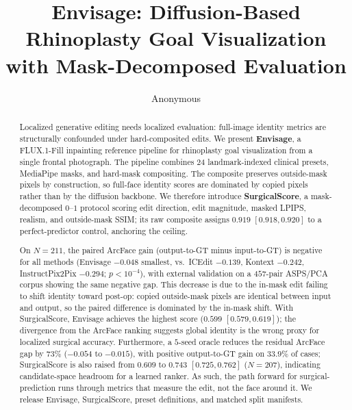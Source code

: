 \documentclass{article}
\title{Envisage: Diffusion-Based Rhinoplasty Goal Visualization with Mask-Decomposed Evaluation}
\author{Anonymous}
\newcommand{\method}{Envisage}
\begin{document}
\maketitle

\begin{abstract}
Localized generative editing needs localized evaluation: full-image identity
metrics are structurally confounded under hard-composited edits. We present
\textbf{\method{}}, a FLUX.1-Fill inpainting reference pipeline for
rhinoplasty goal visualization from a single frontal photograph. The
pipeline combines $24$ landmark-indexed clinical presets, MediaPipe masks,
and hard-mask compositing. The composite preserves outside-mask pixels by
construction, so full-face identity scores are dominated by copied pixels
rather than by the diffusion backbone. We therefore introduce
\textbf{SurgicalScore}, a mask-decomposed $0$--$1$ protocol scoring edit
direction, edit magnitude, masked LPIPS, realism, and outside-mask SSIM;
its raw composite assigns $0.919$ $[0.918, 0.920]$ to a perfect-predictor
control, anchoring the ceiling.

On $N{=}211$, the paired ArcFace gain (output-to-GT minus
input-to-GT) is negative for all methods (\method{} $-0.048$ smallest,
vs.\ ICEdit $-0.139$, Kontext $-0.242$, InstructPix2Pix $-0.294$;
$p<10^{-4}$), with external validation on a $457$-pair ASPS/PCA corpus
showing the same negative gap. This decrease is due to the in-mask edit
failing to shift identity toward post-op: copied outside-mask pixels
are identical between input and output, so the paired difference is
dominated by the in-mask shift. With SurgicalScore, \method{} achieves
the highest score ($0.599$ $[0.579, 0.619]$); the divergence from the
ArcFace ranking suggests global identity is the wrong proxy for localized
surgical accuracy. Furthermore, a $5$-seed oracle reduces the residual ArcFace gap by
$73\%$ ($-0.054$ to $-0.015$), with positive output-to-GT gain on $33.9\%$
of cases; SurgicalScore is also raised from $0.609$ to $0.743$
$[0.725, 0.762]$ ($N{=}207$), indicating candidate-space headroom for a
learned ranker. As such, the path forward for surgical-prediction runs through metrics
that measure the edit, not the face around it. We release
\method{}, SurgicalScore, preset definitions, and matched split manifests.
\end{abstract}
\end{document}

